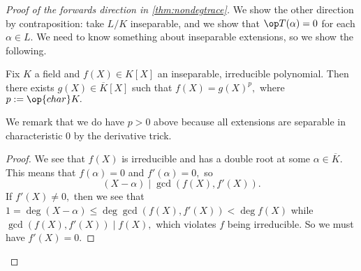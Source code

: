 \documentclass[../notes.tex]{subfiles}
\begin{document}
\begin{proof}[Proof of the forwards direction in \autoref{thm:nondegtrace}]
	We show the other direction by contraposition: take $L/K$ inseparable, and we show that $\op T(\alpha)=0$ for each $\alpha\in L.$ We need to know something about inseparable extensions, so we show the following.
	\begin{lemma} \label{lem:inseptheory}
		Fix $K$ a field and $f(X)\in K[X]$ an inseparable, irreducible polynomial. Then there exists $g(X)\in\overline K[X]$ such that $f(X)=g(X)^p,$ where $p:=\op{char}K.$
	\end{lemma}
	We remark that we do have $p>0$ above because all extensions are separable in characteristic $0$ by the derivative trick.
	\begin{proof}
		We see that $f(X)$ is irreducible and has a double root at some $\alpha\in\overline K.$ This means that $f(\alpha)=0$ and $f'(\alpha)=0,$ so
		\[(X-\alpha)\mid\gcd(f(X),f'(X)).\]
		If $f'(X)\ne0,$ then we see that $1=\deg(X-\alpha)\le\deg\gcd(f(X),f'(X))<\deg f(X)$ while $\gcd(f(X),f'(X))\mid f(X),$ which violates $f$ being irreducible. So we must have $f'(X)=0.$


\end{proof}
\end{proof}
\end{document}
